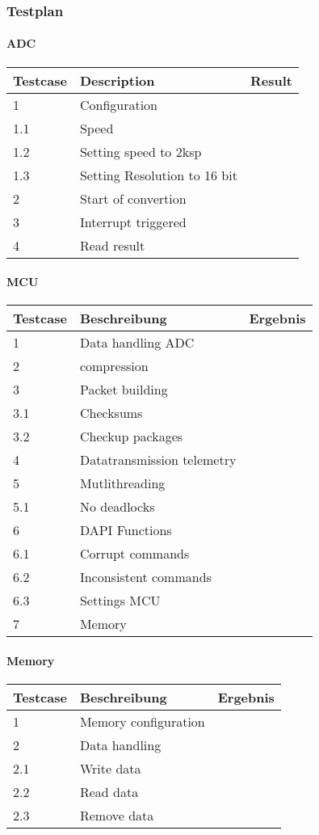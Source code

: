 \documentclass[
]{article}
\author{}
\date{}
\begin{document}
\hypertarget{header-n154}{%
\subsubsection{Testplan}\label{header-n154}}

\hypertarget{header-n156}{%
\paragraph{ADC}\label{header-n156}}

\begin{longtable}[]{@{}lll@{}}
\toprule
Testcase & Description & Result\tabularnewline
\midrule
\endhead
1 & Configuration &\tabularnewline
1.1 & Speed &\tabularnewline
1.2 & Setting speed to 2ksp &\tabularnewline
1.3 & Setting Resolution to 16 bit &\tabularnewline
2 & Start of convertion &\tabularnewline
3 & Interrupt triggered &\tabularnewline
4 & Read result &\tabularnewline
\bottomrule
\end{longtable}

\hypertarget{header-n190}{%
\paragraph{\texorpdfstring{MCU }{MCU }}\label{header-n190}}

\begin{longtable}[]{@{}lll@{}}
\toprule
Testcase & Beschreibung & Ergebnis\tabularnewline
\midrule
\endhead
1 & Data handling ADC &\tabularnewline
2 & compression &\tabularnewline
3 & Packet building &\tabularnewline
3.1 & Checksums &\tabularnewline
3.2 & Checkup packages &\tabularnewline
4 & Datatransmission telemetry &\tabularnewline
5 & Mutlithreading &\tabularnewline
5.1 & No deadlocks &\tabularnewline
6 & DAPI Functions &\tabularnewline
6.1 & Corrupt commands &\tabularnewline
6.2 & Inconsistent commands &\tabularnewline
6.3 & Settings MCU &\tabularnewline
7 & Memory &\tabularnewline
\bottomrule
\end{longtable}

\hypertarget{header-n248}{%
\paragraph{\texorpdfstring{Memory }{Memory }}\label{header-n248}}

\begin{longtable}[]{@{}lll@{}}
\toprule
Testcase & Beschreibung & Ergebnis\tabularnewline
\midrule
\endhead
1 & Memory configuration &\tabularnewline
2 & Data handling &\tabularnewline
2.1 & Write data &\tabularnewline
2.2 & Read data &\tabularnewline
2.3 & Remove data &\tabularnewline
\bottomrule
\end{longtable}
\end{document}
